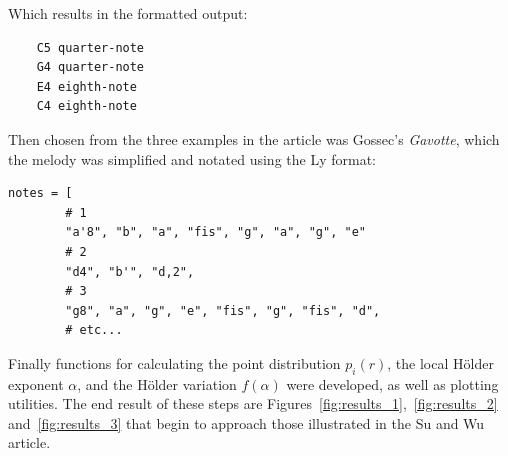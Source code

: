 \documentclass{article}
\begin{document}
Which results in the formatted output:

\begin{verbatim}
    C5 quarter-note
    G4 quarter-note
    E4 eighth-note
    C4 eighth-note
\end{verbatim}

Then chosen from the three examples in the article was Gossec's \emph{Gavotte},
which the melody was simplified and notated using the Ly format:

\begin{verbatim}
notes = [
        # 1
        "a'8", "b", "a", "fis", "g", "a", "g", "e"
        # 2
        "d4", "b'", "d,2",
        # 3
        "g8", "a", "g", "e", "fis", "g", "fis", "d",
        # etc...
\end{verbatim}

Finally functions for calculating the point distribution $p_i(r)$, the local Hölder
exponent $\alpha$, and the Hölder variation $f(\alpha)$ were developed, as well
as plotting utilities. The end result of these steps are
Figures~\ref{fig:results_1},~\ref{fig:results_2} and~\ref{fig:results_3}
that begin to
approach those illustrated in the Su and Wu article.
\end{document}
